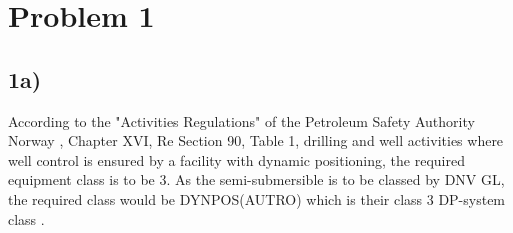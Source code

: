 \newpage
\section*{Problem 1}

\subsection*{1a)} \label{problem_1a}


According to the "Activities Regulations" of the Petroleum Safety Authority Norway \cite{Petroleum_Authority}, Chapter XVI, Re Section 90, Table 1, drilling and well activities where well control is ensured by a facility with dynamic positioning, the required equipment class is to be 3. As the semi-submersible is to be classed by DNV GL, the required class would be DYNPOS(AUTRO) which is their class 3 DP-system class \cite{RulesShipsDNVGLPart6Chap3}. 

\begin{comment}

\cite{Petroleum_Authority}

Chapter XVI - Maritime Operations
Section 90 - Positioning
Table 1 Equipment Class

d) Drilling and well activities: Where well control is ensured by a facility with dynamic positioning: Class 3

The equipment class is described in the IMO/MSC Circular 645, Chapter 2, Equipment Classes.

2.9 Functional requirements
In order to meet the single failure criteria it will normally be necessary to provide:
1) For equipment class 2 - redundancy of all active components.

2) For equipment class 3 - redundancy of all components and physical separation of the components.
\end{comment}
